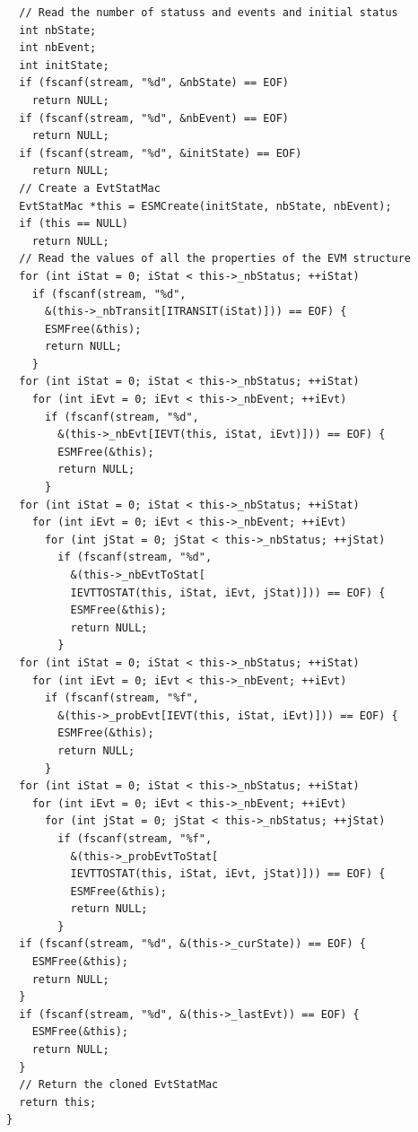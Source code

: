 \documentclass[12pt, a4paper]{article}
\begin{document}
\begin{scriptsize}
\begin{ttfamily}
\begin{lstlisting}
  // Read the number of statuss and events and initial status
  int nbState;
  int nbEvent;
  int initState;
  if (fscanf(stream, "%d", &nbState) == EOF)
    return NULL;
  if (fscanf(stream, "%d", &nbEvent) == EOF)
    return NULL;
  if (fscanf(stream, "%d", &initState) == EOF)
    return NULL;
  // Create a EvtStatMac
  EvtStatMac *this = ESMCreate(initState, nbState, nbEvent);
  if (this == NULL)
    return NULL;
  // Read the values of all the properties of the EVM structure
  for (int iStat = 0; iStat < this->_nbStatus; ++iStat)
    if (fscanf(stream, "%d", 
      &(this->_nbTransit[ITRANSIT(iStat)])) == EOF) {
      ESMFree(&this);
      return NULL;
    }
  for (int iStat = 0; iStat < this->_nbStatus; ++iStat)
    for (int iEvt = 0; iEvt < this->_nbEvent; ++iEvt)
      if (fscanf(stream, "%d", 
        &(this->_nbEvt[IEVT(this, iStat, iEvt)])) == EOF) {
        ESMFree(&this);
        return NULL;
      }
  for (int iStat = 0; iStat < this->_nbStatus; ++iStat)
    for (int iEvt = 0; iEvt < this->_nbEvent; ++iEvt)
      for (int jStat = 0; jStat < this->_nbStatus; ++jStat)
        if (fscanf(stream, "%d", 
          &(this->_nbEvtToStat[
          IEVTTOSTAT(this, iStat, iEvt, jStat)])) == EOF) {
          ESMFree(&this);
          return NULL;
        }
  for (int iStat = 0; iStat < this->_nbStatus; ++iStat)
    for (int iEvt = 0; iEvt < this->_nbEvent; ++iEvt)
      if (fscanf(stream, "%f", 
        &(this->_probEvt[IEVT(this, iStat, iEvt)])) == EOF) {
        ESMFree(&this);
        return NULL;
      }
  for (int iStat = 0; iStat < this->_nbStatus; ++iStat)
    for (int iEvt = 0; iEvt < this->_nbEvent; ++iEvt)
      for (int jStat = 0; jStat < this->_nbStatus; ++jStat)
        if (fscanf(stream, "%f", 
          &(this->_probEvtToStat[
          IEVTTOSTAT(this, iStat, iEvt, jStat)])) == EOF) {
          ESMFree(&this);
          return NULL;
        }
  if (fscanf(stream, "%d", &(this->_curState)) == EOF) {
    ESMFree(&this);
    return NULL;
  }
  if (fscanf(stream, "%d", &(this->_lastEvt)) == EOF) {
    ESMFree(&this);
    return NULL;
  }
  // Return the cloned EvtStatMac
  return this;
}


\end{lstlisting}
\end{ttfamily}
\end{scriptsize}
\end{document}
